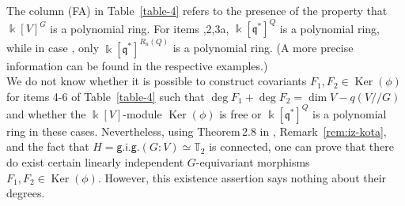 \noindent
The column {\sf (FA)} in Table~\ref{table-4} refers to the presence of the property that ${\Bbbk}[V]^G$ is a 
polynomial ring. For items {,2,3a}, ${\Bbbk}[{{\mathfrak q}}^*]^Q$ is a polynomial ring, while in case {}, only 
${\Bbbk}[{{\mathfrak q}}^*]^{R_u(Q)}$ is a polynomial ring. (A more precise information can be found in the respective examples.)
\\ \indent
We do not know whether it is possible to construct  covariants $F_1,F_2\in {\operatorname{Ker}}(\phi)$ for 
items 4-6 of Table~\ref{table-4} such that $\deg F_1+\deg F_2=\dim V -q(V{/\!\!/} G)$ and whether the ${\Bbbk}[V]$-module ${\operatorname{Ker}}(\phi)$ is free or ${\Bbbk}[{{\mathfrak q}}^*]^Q$ is 
a polynomial ring in these cases. Nevertheless, using Theorem\,2.8 in \cite{Y16}, Remark~\ref{rem:iz-kota}, 
and the fact that $H={\mathsf{g.i.g.}}(G:V)\simeq {{\mathbb T}}_2$ is connected, one can prove that there do exist certain linearly 
independent $G$-equivariant morphisms $F_1, F_2\in {\operatorname{Ker}}(\phi)$. However, this existence assertion says
nothing about their degrees.


